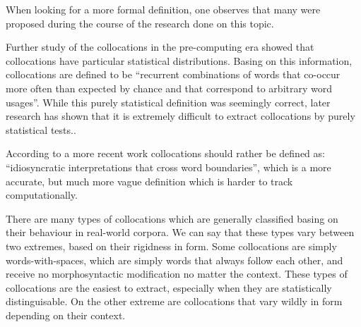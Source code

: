 \documentclass[a4paper,12pt,oneside]{article}
\begin{document}
When looking for a more formal definition, one observes that many were proposed during the course of the research done on this topic.

Further study of the collocations in the pre-computing era showed that collocations have particular statistical distributions\cite{smadja93}.
Basing on this information, collocations are defined to be ``recurrent combinations of words that co-occur more often than expected by chance and that correspond to arbitrary word usages''.
While this purely statistical definition was seemingly correct, later research has shown that it is extremely difficult to extract collocations by purely statistical tests.\cite{1118854}.

According to a more recent work collocations should rather be defined as: ``idiosyncratic interpretations that cross word boundaries''\cite{sag02multiword}, which is a more accurate, but much more vague definition which is harder to track computationally. 

There are many types of collocations which are generally classified basing on their behaviour in real-world corpora. We can say that these types vary between two extremes, based on their rigidness in form. Some collocations are simply words-with-spaces, which are simply words that always follow each other, and receive no morphosyntactic modification no matter the context. These types of collocations are the easiest to extract, especially when they are statistically distinguisable. On the other extreme are collocations that vary wildly in form depending on their context.
\end{document}

